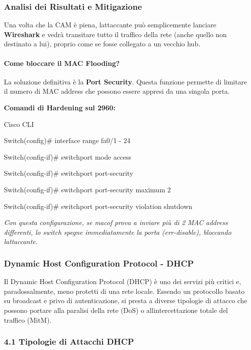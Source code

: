 \documentclass[11pt,a4paper]{article}
\begin{document}
\subsubsection{Analisi dei Risultati e
Mitigazione}\label{analisi-dei-risultati-e-mitigazione}

Una volta che la CAM è piena, l\textquotesingle attaccante può
semplicemente lanciare \textbf{Wireshark} e vedrà transitare tutto il
traffico della rete (anche quello non destinato a lui), proprio come se
fosse collegato a un vecchio hub.

\paragraph{Come bloccare il MAC
Flooding?}\label{come-bloccare-il-mac-flooding}

La soluzione definitiva è la \textbf{Port Security}. Questa funzione
permette di limitare il numero di MAC address che possono essere appresi
da una singola porta.

\textbf{Comandi di Hardening sul 2960:}

Cisco CLI

Switch(config)\# interface range fa0/1 - 24

Switch(config-if)\# switchport mode access

Switch(config-if)\# switchport port-security

Switch(config-if)\# switchport port-security maximum 2

Switch(config-if)\# switchport port-security violation shutdown

\emph{Con questa configurazione, se macof prova a inviare più di 2 MAC
address differenti, lo switch spegne immediatamente la porta
(err-disable), bloccando l\textquotesingle attaccante.}

\subsubsection{Dynamic Host Configuration Protocol -
DHCP}\label{dynamic-host-configuration-protocol---dhcp}

Il Dynamic Host Configuration Protocol (DHCP) è uno dei servizi più
critici e, paradossalmente, meno protetti di una rete locale. Essendo un
protocollo basato su broadcast e privo di autenticazione, si presta a
diverse tipologie di attacco che possono portare alla paralisi della
rete (DoS) o all\textquotesingle intercettazione totale del traffico
(MitM).

\subsubsection{4.1 Tipologie di Attacchi
DHCP}\label{tipologie-di-attacchi-dhcp}
\end{document}
